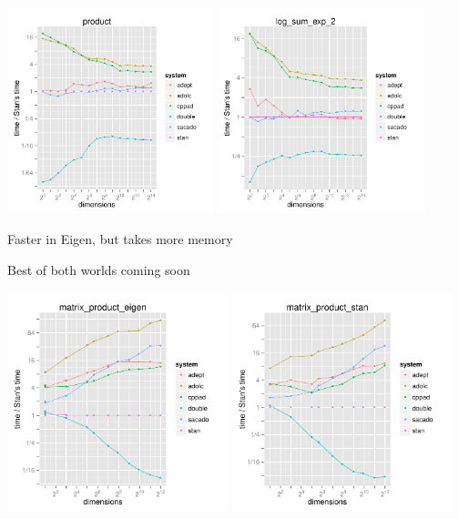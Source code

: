 \documentclass[10pt]{report}
\begin{document}
%
\hfill \hfill
\includegraphics[width=0.45\textwidth]{img/product_rel_eval.pdf}
\hfill
\includegraphics[width=0.45\textwidth]{img/log_sum_exp_2_rel_eval.pdf}
\hfill \hfill


%
\vspace*{-6pt}
\begin{subitemize}
\item Faster in Eigen, but takes more memory
\item Best of both worlds coming soon
\end{subitemize}
\vspace*{-8pt}
\hfill \hfill
\includegraphics[width=0.48\textwidth]{img/autodiff-eval-matrix-product-eigen.pdf}
\hfill
\includegraphics[width=0.48\textwidth]{img/matrix_product_stan_rel_eval.pdf}
\hfill \hfill
\end{document}
